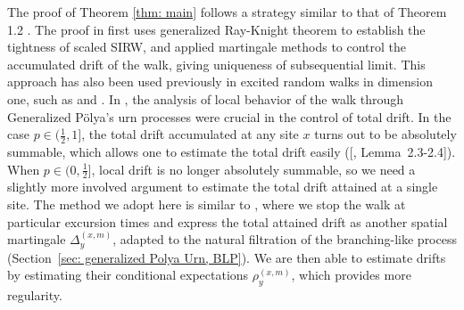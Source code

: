 \documentclass[twoside,12pt,a4paper]{article}
\numberwithin{equation}{section}
\newcommand\TBD{\textcolor{red}{TBD.}}
\begin{document}
	
	The proof of Theorem \ref{thm: main} follows a strategy similar to that of Theorem 1.2 \cite{KMP22}. The proof in \cite{KMP22} first uses generalized Ray-Knight theorem to establish the tightness of scaled SIRW, and applied martingale methods to control the accumulated drift of the walk, giving uniqueness of subsequential limit. 
	This approach
	has also been used previously in excited random walks in dimension one, such as \cite{DK12} and \cite{KP16}. %
	In \cite{KMP22}, the analysis of local behavior of the walk through Generalized P\"olya's urn processes were crucial in the control of total drift. 
	In the case $p \in (\frac{1}{2}, 1]$, the total drift accumulated at any site $x$ turns out to be absolutely summable, which allows one to estimate the total drift easily ([\cite{KMP22}, Lemma~2.3-2.4]).
	When $p \in (0,\frac{1}{2}]$, local drift is no longer absolutely summable, so we need a slightly more involved argument to estimate the total drift attained at a single site. The method we adopt here is similar to \cite{KP16}, where we stop the walk at particular excursion times and express the total attained drift as another spatial martingale $\Delta_y^{(x,m)}$, adapted to the natural filtration of the branching-like process (Section~\ref{sec: generalized Polya Urn, BLP}). We are then able to estimate drifts by estimating their conditional expectations $\rho_y^{(x,m)}$, which provides more regularity.
	
\end{document}
